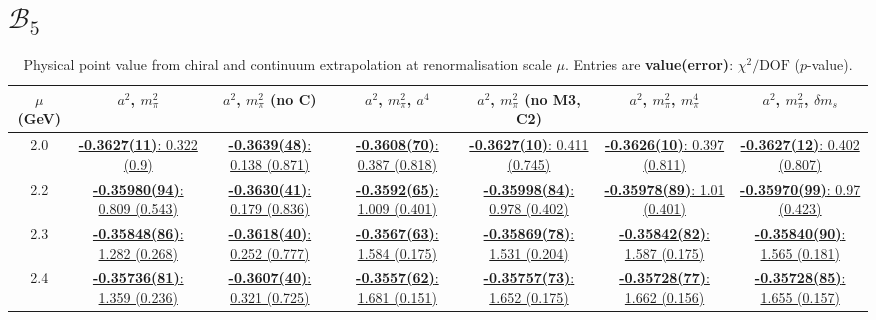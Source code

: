 \documentclass[12pt]{extarticle}
\begin{document}
\section{$\mathcal{B}_5$}
\begin{table}[h!]
\begin{center}
\begin{tabular}{|c|c|c|c|c|c|c|}
\hline
$\mu$ (GeV) & $a^2$, $m_\pi^2$& $a^2$, $m_\pi^2$ (no C)& $a^2$, $m_\pi^2$, $a^4$& $a^2$, $m_\pi^2$ (no M3, C2)& $a^2$, $m_\pi^2$, $m_\pi^4$& $a^2$, $m_\pi^2$, $\delta m_s$\\
\hline
2.0& \hyperlink{TT/NPR/bag_a2m2_20.pdf.1}{\textbf{-0.3627(11)}: 0.322 (0.9)} & \hyperlink{TT/NPR/bag_a2m2noC_20.pdf.1}{\textbf{-0.3639(48)}: 0.138 (0.871)} & \hyperlink{TT/NPR/bag_a2a4m2_20.pdf.1}{\textbf{-0.3608(70)}: 0.387 (0.818)} & \hyperlink{TT/NPR/bag_a2m2mcut_20.pdf.1}{\textbf{-0.3627(10)}: 0.411 (0.745)} & \hyperlink{TT/NPR/bag_a2m2m4_20.pdf.1}{\textbf{-0.3626(10)}: 0.397 (0.811)} & \hyperlink{TT/NPR/bag_a2m2delm_20.pdf.1}{\textbf{-0.3627(12)}: 0.402 (0.807)}\\
2.2& \hyperlink{TT/NPR/bag_a2m2_22.pdf.1}{\textbf{-0.35980(94)}: 0.809 (0.543)} & \hyperlink{TT/NPR/bag_a2m2noC_22.pdf.1}{\textbf{-0.3630(41)}: 0.179 (0.836)} & \hyperlink{TT/NPR/bag_a2a4m2_22.pdf.1}{\textbf{-0.3592(65)}: 1.009 (0.401)} & \hyperlink{TT/NPR/bag_a2m2mcut_22.pdf.1}{\textbf{-0.35998(84)}: 0.978 (0.402)} & \hyperlink{TT/NPR/bag_a2m2m4_22.pdf.1}{\textbf{-0.35978(89)}: 1.01 (0.401)} & \hyperlink{TT/NPR/bag_a2m2delm_22.pdf.1}{\textbf{-0.35970(99)}: 0.97 (0.423)}\\
2.3& \hyperlink{TT/NPR/bag_a2m2_23.pdf.1}{\textbf{-0.35848(86)}: 1.282 (0.268)} & \hyperlink{TT/NPR/bag_a2m2noC_23.pdf.1}{\textbf{-0.3618(40)}: 0.252 (0.777)} & \hyperlink{TT/NPR/bag_a2a4m2_23.pdf.1}{\textbf{-0.3567(63)}: 1.584 (0.175)} & \hyperlink{TT/NPR/bag_a2m2mcut_23.pdf.1}{\textbf{-0.35869(78)}: 1.531 (0.204)} & \hyperlink{TT/NPR/bag_a2m2m4_23.pdf.1}{\textbf{-0.35842(82)}: 1.587 (0.175)} & \hyperlink{TT/NPR/bag_a2m2delm_23.pdf.1}{\textbf{-0.35840(90)}: 1.565 (0.181)}\\
2.4& \hyperlink{TT/NPR/bag_a2m2_24.pdf.1}{\textbf{-0.35736(81)}: 1.359 (0.236)} & \hyperlink{TT/NPR/bag_a2m2noC_24.pdf.1}{\textbf{-0.3607(40)}: 0.321 (0.725)} & \hyperlink{TT/NPR/bag_a2a4m2_24.pdf.1}{\textbf{-0.3557(62)}: 1.681 (0.151)} & \hyperlink{TT/NPR/bag_a2m2mcut_24.pdf.1}{\textbf{-0.35757(73)}: 1.652 (0.175)} & \hyperlink{TT/NPR/bag_a2m2m4_24.pdf.1}{\textbf{-0.35728(77)}: 1.662 (0.156)} & \hyperlink{TT/NPR/bag_a2m2delm_24.pdf.1}{\textbf{-0.35728(85)}: 1.655 (0.157)}\\
\hline
\end{tabular}
\caption{Physical point value from chiral and continuum extrapolation at renormalisation scale $\mu$. Entries are \textbf{value(error)}: $\chi^2/\text{DOF}$ ($p$-value).}
\end{center}
\end{table}
\end{document}
